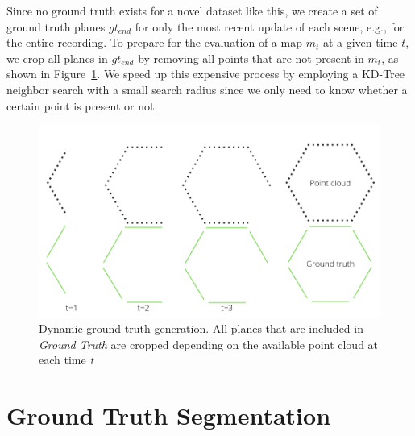 \documentclass[main.tex]{subfiles}
\begin{document}
Since no ground truth exists for a novel dataset like this, we create a set of ground truth planes $gt_{end}$ for only the most recent update of each scene, e.g., for the entire recording.
To prepare for the evaluation of a map $m_t$ at a given time $t$, we crop all planes in $gt_{end}$ by removing all points that are not present in $m_t$, as shown in
Figure~\ref{fig:dynGT}.
We speed up this expensive process by employing a KD-Tree neighbor search with a small search radius since we only need to know whether a certain point is present or not.
\begin{figure}[H]
    \centering
    \includegraphics[width=15 cm]{images/dynamic_eval.png}
    \caption[Dynamic Ground Truth Generation]{Dynamic ground truth generation. All planes that are included in \textit{Ground Truth} are cropped depending on
        the available point cloud at each time \textit{t} }
    \label{fig:dynGT}
\end{figure}



\section{Ground Truth Segmentation}
\label{sec:gtseg}
\end{document}
